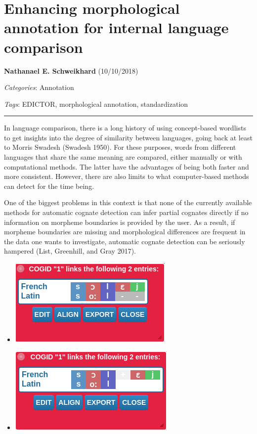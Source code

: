 \documentclass[
  english,
  a4paper,
  oneside,tablecaptionabove
]{scrbook}
\providecommand{\tightlist}{%
  \setlength{\itemsep}{0pt}\setlength{\parskip}{0pt}}
\begin{document}
\hypertarget{enhancing-morphological-annotation-for-internal-language-comparison}{%
\chapter{Enhancing morphological annotation for internal language
comparison}\label{enhancing-morphological-annotation-for-internal-language-comparison}}

\textbf{Nathanael E. Schweikhard} (10/10/2018)

\emph{Categories}: Annotation

\emph{Tags}: EDICTOR, morphological annotation, standardization

\begin{center}\rule{0.5\linewidth}{\linethickness}\end{center}

In language {comparison,} there is a long history of using concept-based
wordlists to get insights into the degree of similarity between
languages, going back at least to Morris Swadesh (Swadesh 1950). For
these purposes, words from different languages that share the same
meaning are compared, either manually or with computational methods. The
latter have the advantages of being both faster and more consistent.
However, there are also limits to what computer-based methods can detect
for the time being.

One of the biggest problems in this context is that none of the
currently available methods for automatic cognate detection can infer
partial cognates directly if no information on morpheme boundaries is
provided by the user. As a result, if morpheme boundaries are missing
and morphological differences are frequent in the data one wants to
investigate, automatic cognate detection can be seriously hampered
(List, Greenhill, and Gray 2017).

\begin{itemize}
\tightlist
\item
  \includegraphics{images/__f.hypotheses.org_wp-content_blogs.dir_4500_files_2018_10_Graphik1.png}
\item
  \includegraphics{images/__f.hypotheses.org_wp-content_blogs.dir_4500_files_2018_10_Graphik2.png}
\end{itemize}
\end{document}
